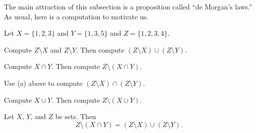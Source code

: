 \documentclass[../notes.tex]{subfiles}
\begin{document}
The main attraction of this subsection is a proposition called ``de Morgan's laws.'' As usual, here is a computation to motivate us.
\begin{example}
    Let $X=\{1,2,3\}$ and $Y=\{1,3,5\}$ and $Z=\{1,2,3,4\}$.
    \begin{listalph}
        \item Compute $Z\setminus X$ and $Z\setminus Y$. Then compute $(Z\setminus X)\cup(Z\setminus Y)$.
        \item Compute $X\cap Y$. Then compute $Z\setminus(X\cap Y)$.
        \item Use (a) above to compute $(Z\setminus X)\cap(Z\setminus Y)$.
        \item Compute $X\cup Y$. Then compute $Z\setminus(X\cup Y)$.
    \end{listalph}
\end{example}
\begin{proposition}  \label{prop:de-morgan}
    Let $X$, $Y$, and $Z$ be sets. Then%
    \[Z\setminus(X\cap Y)=(Z\setminus X)\cup(Z\setminus Y).\]
\end{proposition}
\end{document}
